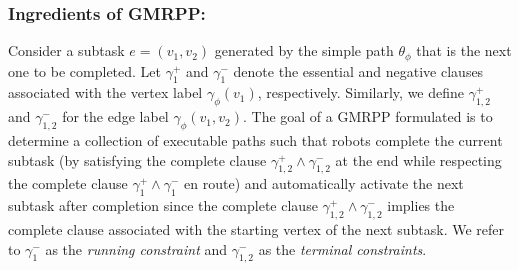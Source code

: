 \documentclass[Afour,sageh,times]{sagej}
\begin{document}
{{ \subsubsection{Ingredients of GMRPP:}\label{sec:gmmpp1} Consider a subtask $e = (v_1, v_2)$ generated by the simple path $\theta_{\phi}$ that is the next one to be completed. Let $\gamma_1^+$ and $\gamma_1^-$ denote the essential and negative clauses associated with the vertex label $\gamma_\phi(v_1)$, respectively. Similarly, we define $\gamma_{1,2}^{+}$ and $\gamma_{1,2}^{-}$  for the edge label $\gamma_\phi(v_1, v_2)$. The goal of a GMRPP formulated  is to determine a collection of executable paths such that robots complete the current subtask (by satisfying the complete clause  $\gamma_{1,2}^+ \wedge \gamma_{1,2}^-$ at the end while respecting the complete clause $\gamma_1^+ \wedge \gamma_1^-$ en route) and automatically activate the next subtask after completion since the complete clause $\gamma_{1,2}^+ \wedge \gamma_{1,2}^-$ implies the complete clause associated with the starting vertex of the next subtask. We refer to $\gamma_1^-$ as the {\it running constraint} and $\gamma_{1,2}^- $  as the {\it terminal constraints}.

}}
\end{document}
